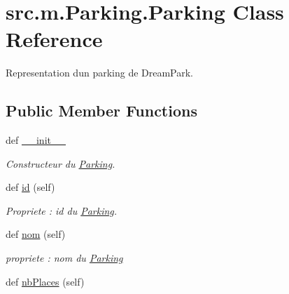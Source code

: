 \hypertarget{classsrc_1_1m_1_1_parking_1_1_parking}{}\section{src.\+m.\+Parking.\+Parking Class Reference}
\label{classsrc_1_1m_1_1_parking_1_1_parking}


Representation d\textquotesingle{}un parking de Dream\+Park.  


\subsection*{Public Member Functions}
\begin{DoxyCompactItemize}
\item 
def \hyperlink{classsrc_1_1m_1_1_parking_1_1_parking_a3093b35a35a9b19a32a9c779f4c47b5b}{\+\_\+\+\_\+init\+\_\+\+\_\+}
\begin{DoxyCompactList}\small\item\em Constructeur du \hyperlink{classsrc_1_1m_1_1_parking_1_1_parking}{Parking}. \end{DoxyCompactList}\item 
\hypertarget{classsrc_1_1m_1_1_parking_1_1_parking_a9da9a365ee1aa296efebb5d256043f65}{}def \hyperlink{classsrc_1_1m_1_1_parking_1_1_parking_a9da9a365ee1aa296efebb5d256043f65}{id} (self)\label{classsrc_1_1m_1_1_parking_1_1_parking_a9da9a365ee1aa296efebb5d256043f65}

\begin{DoxyCompactList}\small\item\em Propriete \+: id du \hyperlink{classsrc_1_1m_1_1_parking_1_1_parking}{Parking}. \end{DoxyCompactList}\item 
\hypertarget{classsrc_1_1m_1_1_parking_1_1_parking_ad87bb7f8ce705702443626149d7cd60a}{}def \hyperlink{classsrc_1_1m_1_1_parking_1_1_parking_ad87bb7f8ce705702443626149d7cd60a}{nom} (self)\label{classsrc_1_1m_1_1_parking_1_1_parking_ad87bb7f8ce705702443626149d7cd60a}

\begin{DoxyCompactList}\small\item\em propriete \+: nom du \hyperlink{classsrc_1_1m_1_1_parking_1_1_parking}{Parking} \end{DoxyCompactList}\item 
\hypertarget{classsrc_1_1m_1_1_parking_1_1_parking_a1a0e40e838f99f2abac555ca3b4dab3a}{}def \hyperlink{classsrc_1_1m_1_1_parking_1_1_parking_a1a0e40e838f99f2abac555ca3b4dab3a}{nb\+Places} (self)\label{classsrc_1_1m_1_1_parking_1_1_parking_a1a0e40e838f99f2abac555ca3b4dab3a}


\end{DoxyCompactItemize}
